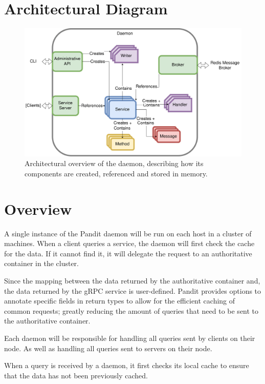\documentclass[a4paper,12pt]{report}
\begin{document}
\section{Architectural Diagram}
\begin{figure}[hbt!]
    \centering
    \includegraphics[width=\linewidth]{arch.png}
    \caption{Architectural overview of the daemon, describing how its components are created, referenced and stored in memory.}
\end{figure}
\section{Overview}
A single instance of the Pandit daemon will be run on each host in a cluster of machines. When a client queries
a service, the daemon will first check the cache for the data. If it cannot find it, it will delegate the request
to an authoritative container in the cluster.

Since the mapping between the data returned by the authoritative container and, the data returned by the gRPC service is
user-defined. Pandit provides options to annotate specific fields in return types to allow for the efficient caching of
common requests; greatly reducing the amount of queries that need to be sent to the authoritative container.

Each daemon will be responsible for handling all queries sent by clients on their node. As well as handling all queries sent to servers on their node.

When a query is received by a daemon, it first checks its local cache to ensure that the data has not been previously cached.
\end{document}
